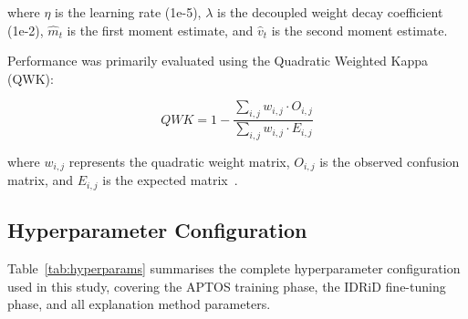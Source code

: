 \documentclass[10pt,twoside]{article}
\begin{document}
\noindent where $\eta$ is the learning rate (1e-5), $\lambda$ is the decoupled weight decay coefficient (1e-2), $\hat{m}_t$ is the first moment estimate, and $\hat{v}_t$ is the second moment estimate.

Performance was primarily evaluated using the Quadratic Weighted Kappa (QWK):

\begin{equation}
\label{eq:qwk}
QWK = 1 - \frac{\sum_{i,j} w_{i,j} \cdot O_{i,j}}{\sum_{i,j} w_{i,j} \cdot E_{i,j}}
\end{equation}

\noindent where $w_{i,j}$ represents the quadratic weight matrix, $O_{i,j}$ is the observed confusion matrix, and $E_{i,j}$ is the expected matrix~\cite{mchugh2012interrater}.

\subsection{Hyperparameter Configuration}

Table~\ref{tab:hyperparams} summarises the complete hyperparameter configuration used in this study, covering the APTOS training phase, the IDRiD fine-tuning phase, and all explanation method parameters.
\end{document}
